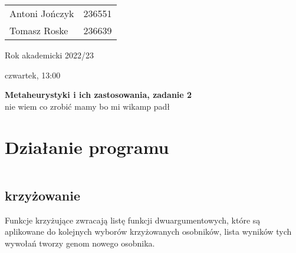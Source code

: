 \documentclass{article}
\begin{document}
\begin{minipage}{0.35\linewidth}
	\begin{tabular}{lr}
		Antoni Jończyk & 236551 \\
		Tomasz Roske   & 236639
	\end{tabular} \hfill
\end{minipage}
\hfill
\begin{minipage}{0.35\linewidth}
	\hfill Rok akademicki 2022/23 \par
	\hfill czwartek, 13:00
\end{minipage}
\bigskip \bigskip \bigskip \bigskip \bigskip
\begin{center}
	\textbf{Metaheurystyki i ich zastosowania, zadanie 2}\\
	\bigskip
	\large nie wiem co zrobić mamy bo mi wikamp padł
\end{center}
\bigskip \bigskip
\section{Działanie programu}
\inputminted{clojure}{snippets/alg.clj_advance}
\subsection{krzyżowanie}
Funkcje krzyżujące zwracają listę funkcji dwuargumentowych, które są aplikowane
do kolejnych wyborów krzyżowanych osobników, lista wyników tych wywołań tworzy
genom nowego osobnika.


\end{document}
